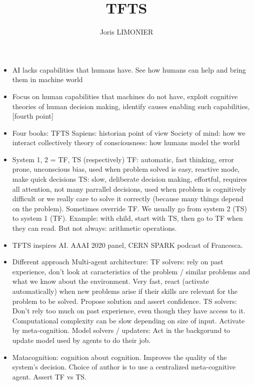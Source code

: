 \documentclass{article}
\title{TFTS}
\author{Joris LIMONIER}
\begin{document}
\maketitle

\begin{itemize}
  \item AI lacks capabilities that humans have. See how humans can help and bring them in machine world
  \item Focus on human capabilities that machines do not have, exploit cognitive theories of human decision making, identify causes enabling such capabilities, [fourth point]
  \item Four books:
        \subitem TFTS
        \subitem Sapiens: historian point of view
        \subitem Society of mind: how we interact collectively
        \subitem theory of consciousness: how humans model the world
  \item System 1, 2 = TF, TS (respectively)
        \subitem TF: automatic, fast thinking, error prone, unconscious bias, used when problem solved is easy, reactive mode, make quick decisions
        \subitem TS: slow, deliberate decision making, effortful, requires all attention, not many parrallel decisions, used when problem is cognitively difficult or we really care to solve it correctly (because many things depend on the problem). Sometimes override TF.
        \subitem We usually go from system 2 (TS) to system 1 (TF). Example: with child, start with TS, then go to TF when they can read. But not always: arithmetic operations.
  \item TFTS inspires AI. AAAI 2020 panel, CERN SPARK podcast of Francesca.
  \item Different approach
        \subitem Multi-agent architecture:
        \subsubitem TF solvers: rely on past experience, don't look at caracteristics of the problem / similar problems and what we know about the environment. Very fast, react (activate automatically) when new problems arise if their skills are relevant for the problem to be solved. Propose solution and assert confidence.
        \subsubitem TS solvers: Don't rely too much on past experience, even though they have access to it. Computational complexity can be slow depending on size of input. Activate by meta-cognition.
        \subsubitem Model solvers / updaters: Act in the backgorund to update model used by agents to do their job.
  \item Matacognition: cognition about cognition. Improves the quality of the system's decision. Choice of author is to use a centralized meta-cognitive agent. Assert TF vs TS.

\end{itemize}
\end{document}
